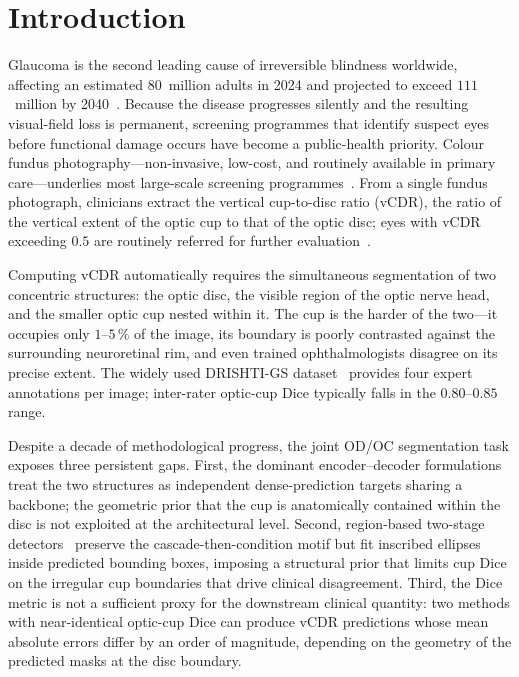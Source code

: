 \documentclass[runningheads]{llncs}
\begin{document}
\section{Introduction}

Glaucoma is the second leading cause of irreversible blindness worldwide, affecting an estimated $80$~million adults in 2024 and projected to exceed $111$~million by 2040~\cite{li2023rdcnn}. Because the disease progresses silently and the resulting visual-field loss is permanent, screening programmes that identify suspect eyes before functional damage occurs have become a public-health priority. Colour fundus photography---non-invasive, low-cost, and routinely available in primary care---underlies most large-scale screening programmes~\cite{retfound2023nature}. From a single fundus photograph, clinicians extract the vertical cup-to-disc ratio (vCDR), the ratio of the vertical extent of the optic cup to that of the optic disc; eyes with vCDR exceeding $0.5$ are routinely referred for further evaluation~\cite{li2023rdcnn,sivaswamy2014drishti}.

Computing vCDR automatically requires the simultaneous segmentation of two concentric structures: the optic disc, the visible region of the optic nerve head, and the smaller optic cup nested within it. The cup is the harder of the two---it occupies only $1$--$5\,\%$ of the image, its boundary is poorly contrasted against the surrounding neuroretinal rim, and even trained ophthalmologists disagree on its precise extent. The widely used DRISHTI-GS dataset~\cite{sivaswamy2014drishti} provides four expert annotations per image; inter-rater optic-cup Dice typically falls in the $0.80$--$0.85$ range.

Despite a decade of methodological progress, the joint OD/OC segmentation task exposes three persistent gaps. First, the dominant encoder--decoder formulations~\cite{chen2021transunet,cao2021swinunet,mrsnet2023,rfaucnxt2023,edcoatunet2025} treat the two structures as independent dense-prediction targets sharing a backbone; the geometric prior that the cup is anatomically contained within the disc is not exploited at the architectural level. Second, region-based two-stage detectors~\cite{li2023rdcnn} preserve the cascade-then-condition motif but fit inscribed ellipses inside predicted bounding boxes, imposing a structural prior that limits cup Dice on the irregular cup boundaries that drive clinical disagreement. Third, the Dice metric is not a sufficient proxy for the downstream clinical quantity: two methods with near-identical optic-cup Dice can produce vCDR predictions whose mean absolute errors differ by an order of magnitude, depending on the geometry of the predicted masks at the disc boundary.
\end{document}
